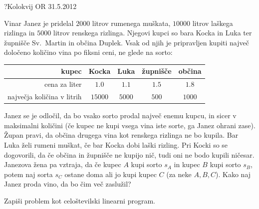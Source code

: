 \begin{naloga}{?}{Kolokvij OR 31.5.2012}
\begin{vprasanje}[vinar]
Vinar Janez je pridelal $2000$ litrov rumenega muškata,
$10000$ litrov laškega rizlinga in $5000$ litrov renskega rizlinga.
Njegovi kupci so bara Kocka in Luka ter župnišče Sv.~Martin in občina Duplek.
Vsak od njih je pripravljen kupiti največ določeno količino vina
po fiksni ceni, ne glede na sorto:

\begin{center}
\begin{tabular}{r|cccc}
kupec & Kocka & Luka & župnišče & občina \\ \hline
cena za liter & $1.0$ & $1.1$ & $1.5$ & $1.8$ \\
največja količina v litrih & $15000$ & $5000$ & $500$ & $1000$ \\
\end{tabular}
\end{center}

Janez se je odločil, da bo vsako sorto prodal največ enemu kupcu,
in sicer v maksimalni količini
(če kupec ne kupi vsega vina iste sorte, ga Janez ohrani zase).
Župan pravi, da občina drugega vina kot renskega rizlinga ne bo kupila.
Bar Luka želi rumeni muškat, če bar Kocka dobi laški rizling.
Pri Kocki so se dogovorili, da če občina in župnišče ne kupijo nič,
tudi oni ne bodo kupili ničesar.
Janezova žena pa vztraja,
da če kupec $A$ kupi sorto $s_A$ in kupec $B$ kupi sorto $s_B$,
potem naj sorta $s_C$ ostane doma ali jo kupi kupec $C$ (za neke $A, B, C$).
Kako naj Janez proda vino, da bo čim več zaslužil?

Zapiši problem kot celoštevilski linearni program.
\end{vprasanje}


\end{naloga}
